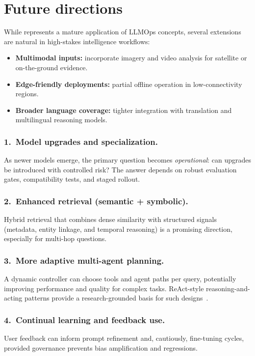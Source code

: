 \section{Future directions}
\label{sec:ishtar-future}

While \ishtar{} represents a mature application of LLMOps concepts, several extensions are natural in high-stakes intelligence workflows:

\begin{itemize}
    \item \textbf{Multimodal inputs:} incorporate imagery and video analysis for satellite or on-the-ground evidence.
    \item \textbf{Edge-friendly deployments:} partial offline operation in low-connectivity regions.
    \item \textbf{Broader language coverage:} tighter integration with translation and multilingual reasoning models.
\end{itemize}

\subsubsection{1.\ Model upgrades and specialization.}
As newer models emerge, the primary question becomes \emph{operational}: can upgrades be introduced with controlled risk?
The answer depends on robust evaluation gates, compatibility tests, and staged rollout.

\subsubsection{2.\ Enhanced retrieval (semantic + symbolic).}
Hybrid retrieval that combines dense similarity with structured signals (metadata, entity linkage, and temporal reasoning) is a promising direction, especially for multi-hop questions.

\subsubsection{3.\ More adaptive multi-agent planning.}
A dynamic controller can choose tools and agent paths per query, potentially improving performance and quality for complex tasks.
ReAct-style reasoning-and-acting patterns provide a research-grounded basis for such designs~\cite{react}.

\subsubsection{4.\ Continual learning and feedback use.}
User feedback can inform prompt refinement and, cautiously, fine-tuning cycles, provided governance prevents bias amplification and regressions.

